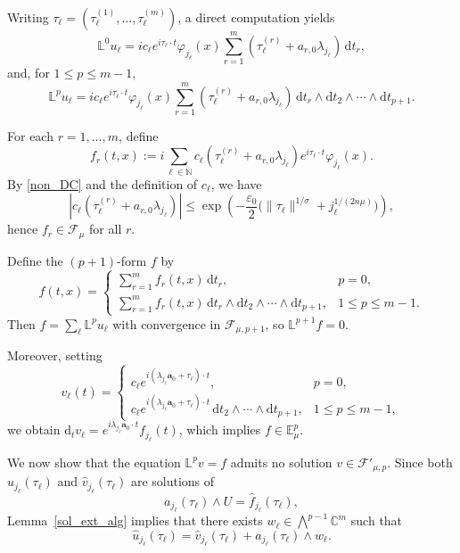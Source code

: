 \documentclass[12pt,reqno]{amsart}
\theoremstyle{definition}
\numberwithin{equation}{section}
\begin{document}
Writing $\tau_\ell=(\tau_\ell^{(1)},\dots,\tau_\ell^{(m)})$, a direct
computation yields
\[
\mathbb{L}^0u_\ell
= i c_\ell e^{i\tau_\ell \cdot t} \varphi_{j_\ell}(x) \sum_{r=1}^m (\tau_\ell^{(r)}+a_{r,0}\lambda_{j_\ell})\,\mathrm{d}t_r,
\]
and, for $1\le p\le m-1$,
\[
\mathbb{L}^pu_\ell
= i c_\ell e^{i\tau_\ell \cdot t}\varphi_{j_\ell}(x) \sum_{r=1}^m (\tau_\ell^{(r)}+a_{r,0}\lambda_{j_\ell})\,
\mathrm{d}t_r\wedge\mathrm{d}t_2\wedge\cdots\wedge\mathrm{d}t_{p+1}.
\]

For each $r=1,\dots,m$, define
\[
f_r(t,x)
:= i\sum_{\ell\in\mathbb{N}}
c_\ell(\tau_\ell^{(r)}+a_{r,0}\lambda_{j_\ell})
e^{i\tau_\ell\cdot t}\varphi_{j_\ell}(x).
\]
By \eqref{non_DC} and the definition of $c_\ell$, we have
\[
|c_\ell(\tau_\ell^{(r)}+a_{r,0}\lambda_{j_\ell})|
\le \exp\!\left(-\frac{\varepsilon_0}{2}
\Big(\|\tau_\ell\|^{1/\sigma}+j_\ell^{1/(2n\mu)}\Big)\right),
\]
hence $f_r\in\mathscr{F}_\mu$ for all $r$.

Define the $(p+1)$-form $f$ by
\[
f(t,x)=
\begin{cases}
	\displaystyle \sum_{r=1}^m f_r(t,x)\,\mathrm{d}t_r, & p=0,\\[1mm]
	\displaystyle \sum_{r=1}^m f_r(t,x)\,
	\mathrm{d}t_r\wedge\mathrm{d}t_2\wedge\cdots\wedge\mathrm{d}t_{p+1},
	& 1\le p\le m-1.
\end{cases}
\]
Then $f=\sum_{\ell}\mathbb{L}^pu_\ell$ with convergence in
$\mathscr{F}_{\mu,p+1}$, so $\mathbb{L}^{p+1}f=0$.

Moreover, setting
\[
v_\ell(t)=
\begin{cases}
	c_\ell e^{i(\lambda_{j_\ell}\boldsymbol{a}_0+\tau_\ell)\cdot t},
	& p=0,\\[1mm]
	c_\ell e^{i(\lambda_{j_\ell}\boldsymbol{a}_0+\tau_\ell)\cdot t}\,
	\mathrm{d}t_2\wedge\cdots\wedge\mathrm{d}t_{p+1},
	& 1\le p\le m-1,
\end{cases}
\]
we obtain $\mathrm{d}_tv_\ell
= e^{i\lambda_{j_\ell}\boldsymbol{a}_0\cdot t}f_{j_\ell}(t)$, which implies
$f\in\mathbb{E}_\mu^p$.

\medskip
We now show that the equation $\mathbb{L}^p v=f$ admits no solution $v\in\mathscr{F}'_{\mu,p}$.
Since both $\widehat u_{j_\ell}(\tau_\ell)$ and
$\widehat v_{j_\ell}(\tau_\ell)$ are solutions of
\[
a_{j_\ell}(\tau_\ell)\wedge U = \widehat f_{j_\ell}(\tau_\ell),
\]
Lemma~\ref{sol_ext_alg} implies that there exists
$w_\ell\in\textstyle\bigwedge^{p-1}\mathbb{C}^m$ such that
\[
\widehat u_{j_\ell}(\tau_\ell)
= \widehat v_{j_\ell}(\tau_\ell)
+ a_{j_\ell}(\tau_\ell)\wedge w_\ell.
\]
\end{document}
